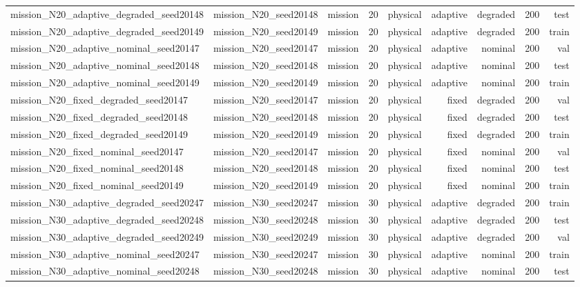 \begin{tabular}{lrrrrrrrr}
mission\_N20\_adaptive\_degraded\_seed20148 & mission\_N20\_seed20148 & mission & 20 & physical & adaptive & degraded & 200 & test \\
mission\_N20\_adaptive\_degraded\_seed20149 & mission\_N20\_seed20149 & mission & 20 & physical & adaptive & degraded & 200 & train \\
mission\_N20\_adaptive\_nominal\_seed20147 & mission\_N20\_seed20147 & mission & 20 & physical & adaptive & nominal & 200 & val \\
mission\_N20\_adaptive\_nominal\_seed20148 & mission\_N20\_seed20148 & mission & 20 & physical & adaptive & nominal & 200 & test \\
mission\_N20\_adaptive\_nominal\_seed20149 & mission\_N20\_seed20149 & mission & 20 & physical & adaptive & nominal & 200 & train \\
mission\_N20\_fixed\_degraded\_seed20147 & mission\_N20\_seed20147 & mission & 20 & physical & fixed & degraded & 200 & val \\
mission\_N20\_fixed\_degraded\_seed20148 & mission\_N20\_seed20148 & mission & 20 & physical & fixed & degraded & 200 & test \\
mission\_N20\_fixed\_degraded\_seed20149 & mission\_N20\_seed20149 & mission & 20 & physical & fixed & degraded & 200 & train \\
mission\_N20\_fixed\_nominal\_seed20147 & mission\_N20\_seed20147 & mission & 20 & physical & fixed & nominal & 200 & val \\
mission\_N20\_fixed\_nominal\_seed20148 & mission\_N20\_seed20148 & mission & 20 & physical & fixed & nominal & 200 & test \\
mission\_N20\_fixed\_nominal\_seed20149 & mission\_N20\_seed20149 & mission & 20 & physical & fixed & nominal & 200 & train \\
mission\_N30\_adaptive\_degraded\_seed20247 & mission\_N30\_seed20247 & mission & 30 & physical & adaptive & degraded & 200 & train \\
mission\_N30\_adaptive\_degraded\_seed20248 & mission\_N30\_seed20248 & mission & 30 & physical & adaptive & degraded & 200 & test \\
mission\_N30\_adaptive\_degraded\_seed20249 & mission\_N30\_seed20249 & mission & 30 & physical & adaptive & degraded & 200 & val \\
mission\_N30\_adaptive\_nominal\_seed20247 & mission\_N30\_seed20247 & mission & 30 & physical & adaptive & nominal & 200 & train \\
mission\_N30\_adaptive\_nominal\_seed20248 & mission\_N30\_seed20248 & mission & 30 & physical & adaptive & nominal & 200 & test \\

\end{tabular}
